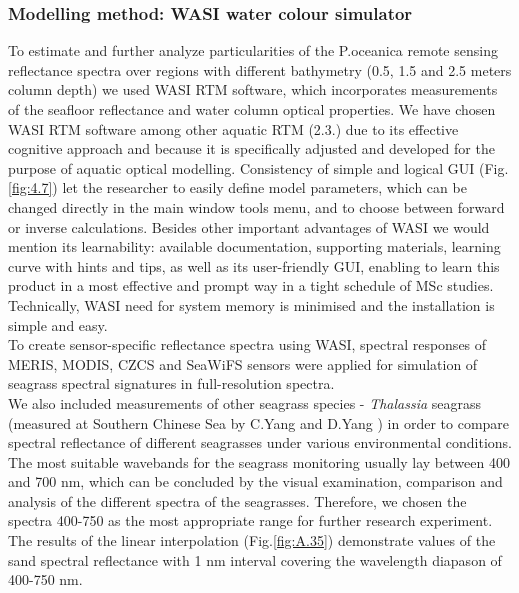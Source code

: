 \documentclass[11pt]{article}
\begin{document}
\subsubsection{Modelling method: WASI water colour simulator}
To estimate and further analyze particularities of the P.oceanica remote sensing reflectance spectra over regions with different bathymetry (0.5, 1.5 and 2.5 meters column depth) we used \ac{WASI} \ac{RTM} software, which incorporates measurements of the seafloor reflectance and water column optical properties. We have chosen \ac{WASI} \ac{RTM} software among other aquatic \ac{RTM} (2.3.) due to its effective cognitive approach and because it is specifically adjusted and developed for the purpose of aquatic optical modelling. Consistency of simple and logical \ac{GUI} (Fig.\ref{fig:4.7})\label{GUI} let the researcher to easily define model parameters, which can be changed directly in the main window tools menu, and to choose between forward or inverse 
calculations. Besides other important advantages of \ac{WASI} we would mention its learnability: available documentation, supporting materials, learning curve with hints and tips, as well as its user-friendly \ac{GUI}, enabling to learn this product in a most effective and prompt way in a tight schedule of MSc studies. Technically, \ac{WASI} need for system memory is minimised and the installation is simple and easy.\\
To create sensor-specific reflectance spectra using \ac{WASI}, spectral responses of \ac{MERIS}, \ac{MODIS}, \ac{CZCS} and \ac{SeaWiFS} sensors were applied for simulation of seagrass spectral signatures in full-resolution spectra.\\
We also included measurements of other seagrass species - \textit{Thalassia} seagrass
(measured at Southern Chinese Sea by C.Yang and D.Yang \cite{Yang10} \label{Yang10}) in order to compare spectral reflectance of
different seagrasses under various environmental conditions.
The most suitable wavebands for the seagrass monitoring usually lay between 400 and 700 nm,
which can be concluded by the visual examination, comparison and analysis of the different spectra of
the seagrasses. Therefore, we chosen the spectra 400-750 as the most appropriate range for
further research experiment. The results of the linear interpolation (Fig.\ref{fig:A.35}) demonstrate values of the
sand spectral reflectance with 1 nm interval covering the wavelength diapason of 400-750 nm.
\end{document}
